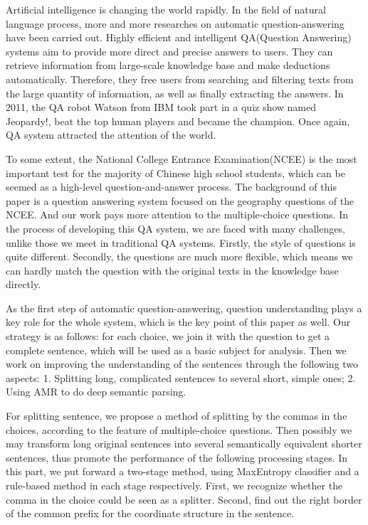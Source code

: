 \documentclass[master, winfont]{njuthesis}
\begin{document}
\begin{englishabstract}
Artificial intelligence is changing the world rapidly. In the field of natural language process, more and more researches on automatic question-answering have been carried out. Highly efficient and intelligent QA(Question Answering) systems aim to provide more direct and precise answers to users. They can retrieve information from large-scale knowledge base and make deductions automatically. Therefore, they free users from searching and filtering texts from the large quantity of information, as well as finally extracting the answers. In 2011, the QA robot Watson from IBM took part in a quiz show named Jeopardy!, beat the top human players and became the champion. Once again, QA system attracted the attention of the world.

To some extent, the National College Entrance Examination(NCEE) is the most important test for the majority of Chinese high school students, which can be seemed as a high-level question-and-answer process. The background of this paper is a question answering system focused on the geography questions of the NCEE. And our work pays more attention to the multiple-choice questions. In the process of developing this QA system, we are faced with many challenges, unlike those we meet in traditional QA systems. Firstly, the style of questions is quite different. Secondly, the questions are much more flexible, which means we can hardly match the question with the original texts in the knowledge base directly.

As the first step of automatic question-answering, question understanding plays a key role for the whole system, which is the key point of this paper as well. Our strategy is as follows: for each choice, we join it with the question to get a complete sentence, which will be used as a basic subject for analysis. Then we work on improving the understanding of the sentences through the following two aspects: 1. Splitting long, complicated sentences to several short, simple ones; 2. Using AMR to do deep semantic parsing. 

For splitting sentence, we propose a method of splitting by the commas in the choices, according to the feature of multiple-choice questions. Then possibly we may transform long original sentences into several semantically equivalent shorter sentences, thus promote the performance of the following processing stages. In this part, we put forward a two-stage method, using MaxEntropy classifier and a rule-based method in each stage respectively. First, we recognize whether the comma in the choice could be seen as a splitter. Second, find out the right border of the common prefix for the coordinate structure in the sentence.


\end{englishabstract}
\end{document}
